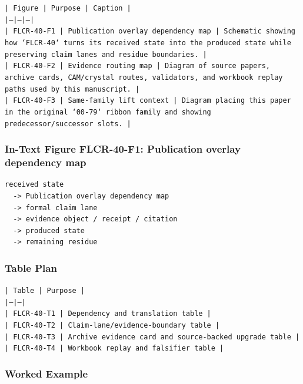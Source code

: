\documentclass[11pt]{article}
\begin{document}
\noindent\texttt{| Figure | Purpose | Caption |}\\
\noindent\texttt{|---|---|---|}\\
\noindent\texttt{| FLCR-40-F1 | Publication overlay dependency map | Schematic showing how `FLCR-40` turns its received state into the produced state while preserving claim lanes and residue boundaries. |}\\
\noindent\texttt{| FLCR-40-F2 | Evidence routing map | Diagram of source papers, archive cards, CAM/crystal routes, validators, and workbook replay paths used by this manuscript. |}\\
\noindent\texttt{| FLCR-40-F3 | Same-family lift context | Diagram placing this paper in the original `00-79` ribbon family and showing predecessor/successor slots. |}\\

\subsubsection*{In-Text Figure FLCR-40-F1: Publication overlay dependency map}

\begin{verbatim}
received state
  -> Publication overlay dependency map
  -> formal claim lane
  -> evidence object / receipt / citation
  -> produced state
  -> remaining residue
\end{verbatim}

\subsubsection*{Table Plan}

\noindent\texttt{| Table | Purpose |}\\
\noindent\texttt{|---|---|}\\
\noindent\texttt{| FLCR-40-T1 | Dependency and translation table |}\\
\noindent\texttt{| FLCR-40-T2 | Claim-lane/evidence-boundary table |}\\
\noindent\texttt{| FLCR-40-T3 | Archive evidence card and source-backed upgrade table |}\\
\noindent\texttt{| FLCR-40-T4 | Workbook replay and falsifier table |}\\

\subsubsection*{Worked Example}
\end{document}
